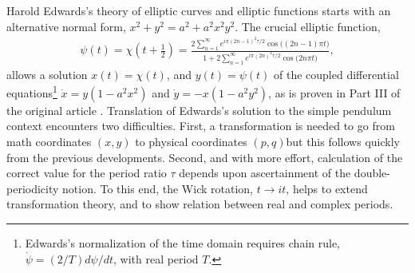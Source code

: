 \documentclass[nofootinbib,preprint]{revtex4-1}
\begin{document}
Harold Edwards's theory of elliptic curves and elliptic functions starts with an 
alternative normal form, $x^2+y^2 = a^2+a^2 x^2 y^2$. The crucial elliptic function,
\begin{eqnarray}
\psi(t)= \chi(t+\tfrac{1}{2})= \frac{2\sum_{n=1}^{\infty}e^{i \pi(2n-1)^2 \tau/2}\cos\big((2 n-1)\pi t \big) 
}{1+2\sum_{n=1}^{\infty} e^{i \pi(2n)^2 \tau/2}\cos\big(2 n \pi t \big)},\nonumber
\end{eqnarray}
allows a solution $x(t)=\chi(t)$, and $y(t)=\psi(t)$ of
the coupled differential equations\footnote{Edwards's normalization of 
the time domain requires chain rule, $\dot{\psi}=(2/T) d\psi/dt  $, with real period $T$.}
${\dot{x}=y(1-a^2 x^2)}$ and $\dot{y}=-x(1-a^2 y^2)$,
as is proven in Part III of the original article \cite{EDWARDS2007}. Translation of Edwards's 
solution to the simple pendulum context encounters two difficulties. First, a  
transformation is needed to go from math coordinates $(x,y)$ to physical coordinates 
$(p,q)$\textemdash but this follows quickly from the previous developments. Second,
and with more effort, calculation of the correct value for the period ratio $\tau$ 
depends upon ascertainment of the double-periodicity notion. To this end, the Wick rotation, 
$t \rightarrow i t$, helps to extend transformation theory,
and to show relation between real and complex periods. 
\end{document}
